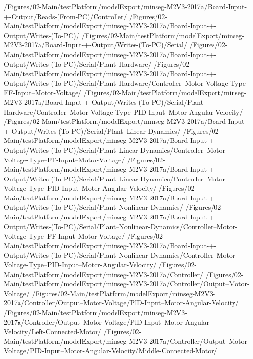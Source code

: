 {             {\main/Figures/02-Main/testPlatform/modelExport/minseg-M2V3-2017a/Board-Input-+-Output/Reads-(From-PC)/Controller/}
             {\main/Figures/02-Main/testPlatform/modelExport/minseg-M2V3-2017a/Board-Input-+-Output/Writes-(To-PC)/}
             {\main/Figures/02-Main/testPlatform/modelExport/minseg-M2V3-2017a/Board-Input-+-Output/Writes-(To-PC)/Serial/}
             {\main/Figures/02-Main/testPlatform/modelExport/minseg-M2V3-2017a/Board-Input-+-Output/Writes-(To-PC)/Serial/Plant--Hardware/}
             {\main/Figures/02-Main/testPlatform/modelExport/minseg-M2V3-2017a/Board-Input-+-Output/Writes-(To-PC)/Serial/Plant--Hardware/Controller--Motor-Voltage-Type--FF-Input--Motor-Voltage/}
             {\main/Figures/02-Main/testPlatform/modelExport/minseg-M2V3-2017a/Board-Input-+-Output/Writes-(To-PC)/Serial/Plant--Hardware/Controller--Motor-Voltage-Type--PID-Input--Motor-Angular-Velocity/}
             {\main/Figures/02-Main/testPlatform/modelExport/minseg-M2V3-2017a/Board-Input-+-Output/Writes-(To-PC)/Serial/Plant--Linear-Dynamics/}
             {\main/Figures/02-Main/testPlatform/modelExport/minseg-M2V3-2017a/Board-Input-+-Output/Writes-(To-PC)/Serial/Plant--Linear-Dynamics/Controller--Motor-Voltage-Type--FF-Input--Motor-Voltage/}
             {\main/Figures/02-Main/testPlatform/modelExport/minseg-M2V3-2017a/Board-Input-+-Output/Writes-(To-PC)/Serial/Plant--Linear-Dynamics/Controller--Motor-Voltage-Type--PID-Input--Motor-Angular-Velocity/}
             {\main/Figures/02-Main/testPlatform/modelExport/minseg-M2V3-2017a/Board-Input-+-Output/Writes-(To-PC)/Serial/Plant--Nonlinear-Dynamics/}
             {\main/Figures/02-Main/testPlatform/modelExport/minseg-M2V3-2017a/Board-Input-+-Output/Writes-(To-PC)/Serial/Plant--Nonlinear-Dynamics/Controller--Motor-Voltage-Type--FF-Input--Motor-Voltage/}
             {\main/Figures/02-Main/testPlatform/modelExport/minseg-M2V3-2017a/Board-Input-+-Output/Writes-(To-PC)/Serial/Plant--Nonlinear-Dynamics/Controller--Motor-Voltage-Type--PID-Input--Motor-Angular-Velocity/}
             {\main/Figures/02-Main/testPlatform/modelExport/minseg-M2V3-2017a/Controller/}
             {\main/Figures/02-Main/testPlatform/modelExport/minseg-M2V3-2017a/Controller/Output--Motor-Voltage/}
             {\main/Figures/02-Main/testPlatform/modelExport/minseg-M2V3-2017a/Controller/Output--Motor-Voltage/PID-Input--Motor-Angular-Velocity/}
             {\main/Figures/02-Main/testPlatform/modelExport/minseg-M2V3-2017a/Controller/Output--Motor-Voltage/PID-Input--Motor-Angular-Velocity/Left-Connected-Motor/}
             {\main/Figures/02-Main/testPlatform/modelExport/minseg-M2V3-2017a/Controller/Output--Motor-Voltage/PID-Input--Motor-Angular-Velocity/Middle-Connected-Motor/}
}
